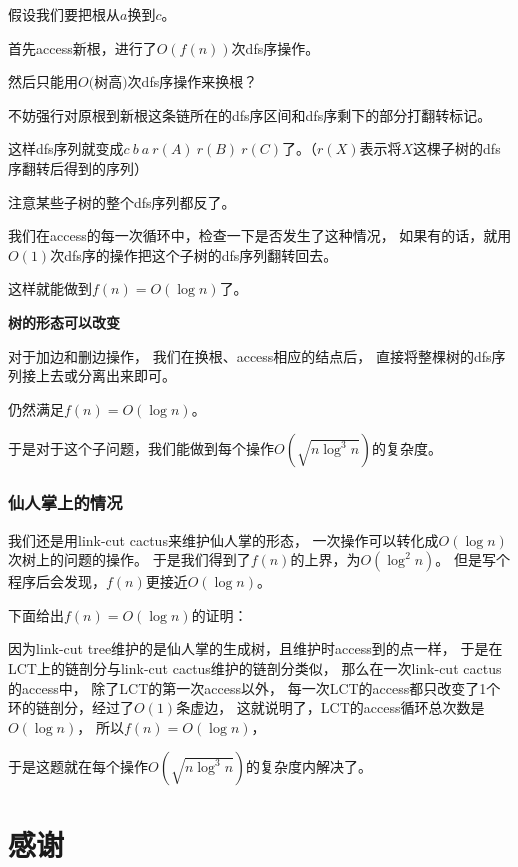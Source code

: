 \documentclass{noithesis}
\begin{document}
假设我们要把根从$a$换到$c$。

首先access新根，进行了$O(f(n))$次dfs序操作。

然后只能用$O($树高$)$次dfs序操作来换根？

\text{}

\text{}

不妨强行对原根到新根这条链所在的dfs序区间和dfs序剩下的部分打翻转标记。

这样dfs序列就变成$c\ b\ a\ r(A)\ r(B)\ r(C)$了。（$r(X)$表示将$X$这棵子树的dfs序翻转后得到的序列）

注意某些子树的整个dfs序列都反了。

我们在access的每一次循环中，检查一下是否发生了这种情况，
如果有的话，就用$O(1)$次dfs序的操作把这个子树的dfs序列翻转回去。

这样就能做到$f(n) = O(\log n)$了。

\text{}

\newpage

\textbf{树的形态可以改变}

对于加边和删边操作，
我们在换根、access相应的结点后，
直接将整棵树的dfs序列接上去或分离出来即可。

仍然满足$f(n) = O(\log n)$。

\text{}

于是对于这个子问题，我们能做到每个操作$O(\sqrt{n \log ^ 3 n})$的复杂度。

\subsubsection{仙人掌上的情况}

我们还是用link-cut cactus来维护仙人掌的形态，
一次操作可以转化成$O(\log n)$次树上的问题的操作。
于是我们得到了$f(n)$的上界，为$O(\log ^ 2 n)$。
但是写个程序后会发现，$f(n)$更接近$O(\log n)$。

下面给出$f(n) = O(\log n)$的证明：

因为link-cut tree维护的是仙人掌的生成树，且维护时access到的点一样，
于是在LCT上的链剖分与link-cut cactus维护的链剖分类似，
那么在一次link-cut cactus的access中，
除了LCT的第一次access以外，
每一次LCT的access都只改变了1个环的链剖分，经过了$O(1)$条虚边，
这就说明了，LCT的access循环总次数是$O(\log n)$，
所以$f(n) = O(\log n)$，

于是这题就在每个操作$O(\sqrt{n \log ^ 3 n})$的复杂度内解决了。



\section{感谢}
\end{document}
